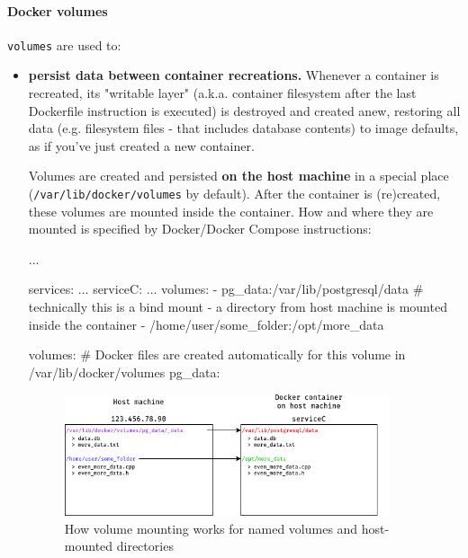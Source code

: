 \documentclass{article}
\newcommand{\dockerinline}[1]{\lstinline[language=docker, style=cstyle, basicstyle=\ttfamily\normalsize]{#1}}
\begin{document}
\paragraph{Docker volumes}

\dockerinline{volumes} are used to:

\begin{itemize}
    \item{\textbf{persist data between container recreations.} Whenever a container is recreated, its "writable layer" (a.k.a. container filesystem after the last Dockerfile instruction is executed) is destroyed and created anew, restoring all data (e.g. filesystem files - that includes database contents) to image defaults, as if you've just created a new container.

        Volumes are created and persisted \textbf{on the host machine} in a special place (\texttt{/var/lib/docker/volumes} by default). After the container is (re)created, these volumes are mounted inside the container. How and where they are mounted is specified by Docker/Docker Compose instructions:

        \begin{dockercode}
            ...

            services:
                ...
                serviceC:
                    ...
                    volumes:
                        - pg_data:/var/lib/postgresql/data
                        # technically this is a bind mount - a directory from host machine is mounted inside the container
                        - /home/user/some_folder:/opt/more_data

            volumes:
                # Docker files are created automatically for this volume in /var/lib/docker/volumes
                pg_data:
        \end{dockercode}

        \begin{figure}[H]
            \centering
            \includegraphics[width=0.9\textwidth]{img/docker_volumes.png}
            \caption{How volume mounting works for named volumes and host-mounted directories}
            \label{preparations:dockervolumes_pic}
        \end{figure}

}
\end{itemize}
\end{document}
